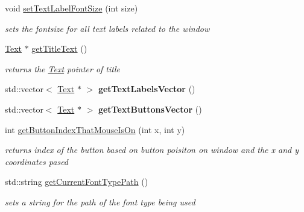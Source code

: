 \begin{DoxyCompactItemize}
void \hyperlink{class_text_based_window_a7354bc5aca3bd79777421ebe413c16b0}{set\+Text\+Label\+Font\+Size} (int size)
\begin{DoxyCompactList}\small\item\em sets the fontsize for all text labels related to the window \end{DoxyCompactList}\item 
\hypertarget{class_text_based_window_ab65f222dce6fdaba84e1e43499ef30c6}{}\label{class_text_based_window_ab65f222dce6fdaba84e1e43499ef30c6} 
\hyperlink{class_text}{Text} $\ast$ \hyperlink{class_text_based_window_ab65f222dce6fdaba84e1e43499ef30c6}{get\+Title\+Text} ()
\begin{DoxyCompactList}\small\item\em returns the \hyperlink{class_text}{Text} pointer of title \end{DoxyCompactList}\item 
\hypertarget{class_text_based_window_a8461c4109986c5dd0f162b9c68f0ba11}{}\label{class_text_based_window_a8461c4109986c5dd0f162b9c68f0ba11} 
std\+::vector$<$ \hyperlink{class_text}{Text} $\ast$ $>$ {\bfseries get\+Text\+Labels\+Vector} ()
\item 
\hypertarget{class_text_based_window_a635b57792c403406ab4b9237e14efa47}{}\label{class_text_based_window_a635b57792c403406ab4b9237e14efa47} 
std\+::vector$<$ \hyperlink{class_text}{Text} $\ast$ $>$ {\bfseries get\+Text\+Buttons\+Vector} ()
\item 
\hypertarget{class_text_based_window_a8e1efbb01b046b4fa93afe796aefc86b}{}\label{class_text_based_window_a8e1efbb01b046b4fa93afe796aefc86b} 
int \hyperlink{class_text_based_window_a8e1efbb01b046b4fa93afe796aefc86b}{get\+Button\+Index\+That\+Mouse\+Is\+On} (int x, int y)
\begin{DoxyCompactList}\small\item\em returns index of the button based on button poisiton on window and the x and y coordinates pased \end{DoxyCompactList}\item 
\hypertarget{class_text_based_window_a3e5f231c415cbe72cc5dca78376f0455}{}\label{class_text_based_window_a3e5f231c415cbe72cc5dca78376f0455} 
std\+::string \hyperlink{class_text_based_window_a3e5f231c415cbe72cc5dca78376f0455}{get\+Current\+Font\+Type\+Path} ()
\begin{DoxyCompactList}\small\item\em sets a string for the path of the font type being used \end{DoxyCompactList}\item 

\end{DoxyCompactItemize}
